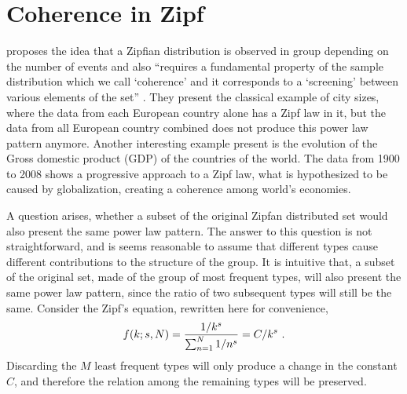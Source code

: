 \section{Coherence in Zipf}
\label{sec:coherencezipf}
\cite{cristelli2012} proposes the idea that a Zipfian distribution is observed in group 
depending on the number of events and also ``requires a fundamental property of the sample
distribution which we call `coherence' and it corresponds to a `screening' between various
elements of the set'' \cite{cristelli2012}. They present the classical example of city sizes, 
where the data from each European country alone has a Zipf law in it, but the data from
all European country combined does not produce this power law pattern anymore. Another
interesting example present is the evolution of the Gross domestic product (GDP) of the 
countries of the world. The data from 1900 to 2008 shows a progressive approach to a
Zipf law, what is hypothesized to be caused by globalization, creating a coherence among
world's economies.

A question arises, whether a subset of the original Zipfan distributed set would also
present the same power law pattern. The answer to this question is not straightforward,
and is seems reasonable to assume that different types cause different contributions 
to the structure of the group. It is intuitive that, a subset of the original set, 
made of the group of most frequent types, will also present the same power law pattern,
since the ratio of two subsequent types will still be the same. Consider the Zipf's equation,
rewritten here for convenience,
\begin{equation} 
f(k; s, N) = \frac{1/k^s}{\sum_{n=1}^{N} 1/n^s} = C / k^s \textmd{ .}
\end{equation}
Discarding the $M$ least frequent types will only produce a change in the constant $C$,
and therefore the relation among the remaining types will be preserved.

